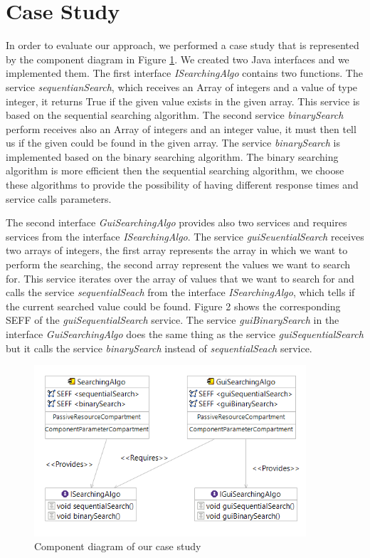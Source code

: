 \section{Case Study}
\label{sec:Case Study}
In order to evaluate our approach, we performed a case study that is represented by the component diagram in Figure \ref{fig:case_study}. We created two Java interfaces and we implemented them. The first interface \textit{ISearchingAlgo} contains two functions. The service \textit{sequentianSearch}, which receives an Array of integers and a value of type integer, it returns True if the given value exists in the given array. This service is based on the sequential searching algorithm. The second service \textit{binarySearch} perform receives also an Array of integers and an integer value, it must then tell us if the given could be found in the given array. The service \textit{binarySearch} is implemented based on the binary searching algorithm. The binary searching algorithm is more efficient then the sequential searching algorithm, we choose these algorithms to provide the possibility of having different response times and service calls parameters. 

The second interface \textit{GuiSearchingAlgo} provides also two services and requires services from the interface \textit{ISearchingAlgo}. The service \textit{guiSeuentialSearch} receives two arrays of integers, the first array represents the array in which we want to perform the searching, the second array represent the values we want to search for. This service iterates over the  array of values that we want to search for and calls the service \textit{sequentialSeach} from the interface \textit{ISearchingAlgo}, which tells if the current searched value could be found. Figure 2 shows the corresponding SEFF of the \textit{guiSequentialSearch} service. The service \textit{guiBinarySearch} in the interface \textit{GuiSearchingAlgo} does the same thing as the service \textit{guiSequentialSearch} but it calls the service \textit{binarySearch} instead of \textit{sequentialSeach} service. 

\begin{figure}[h]
\centering
\includegraphics[width=0.9\textwidth]{figures/case_study}
\caption{Component diagram of our case study}
\label{fig:case_study}
\end{figure}

